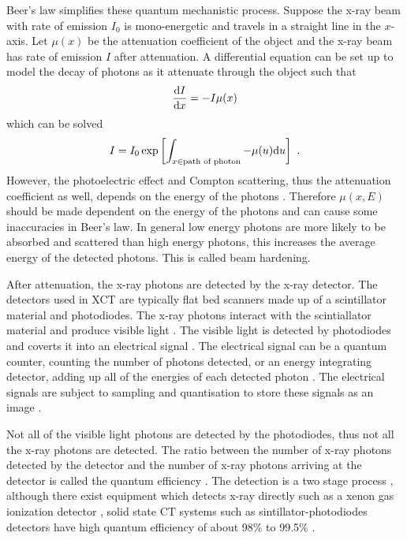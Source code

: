 Beer's law simplifies these quantum mechanistic process. Suppose the x-ray beam with rate of emission $I_0$ is mono-energetic and travels in a straight line in the $x$-axis. Let $\mu(x)$ be the attenuation coefficient of the object and the x-ray beam has rate of emission $I$ after attenuation. A differential equation can be set up to model the decay of photons as it attenuate through the object such that
\begin{equation}
\dfrac{\mathrm{d} I}{\mathrm{d} x} = -I\mu(x)
\end{equation}
which can be solved
\begin{equation}
I = I_0\exp\left[\int_{x \in \text{path of photon}}-\mu(u)\mathrm{d} u\right] \ .
\label{eq:beerLaw}
\end{equation}
However, the photoelectric effect and Compton scattering, thus the attenuation coefficient as well, depends on the energy of the photons \citep{elbakri2002statistical}. Therefore $\mu(x,E)$ should be made dependent on the energy of the photons \citep{cantatore2011introduction} and can cause some inaccuracies in Beer's law. In general low energy photons are more likely to be absorbed and scattered than high energy photons, this increases the average energy of the detected photons. This is called beam hardening.

After attenuation, the x-ray photons are detected by the x-ray detector. The detectors used in XCT are typically flat bed scanners made up of a scintillator material \citep{curran1953luminescence, greskovich1997ceramic} and photodiodes. The x-ray photons interact with the scintiallator material and produce visible light \citep{rossner1993conversion}. The visible light is detected by photodiodes and coverts it into an electrical signal \citep{michael2001x}. The electrical signal can be a quantum counter, counting the number of photons detected, or an energy integrating detector, adding up all of the energies of each detected photon \citep{whiting2006properties, kruth2011computed}. The electrical signals are subject to sampling and quantisation to store these signals as an image \citep{cierniak2011x}.

Not all of the visible light photons are detected by the photodiodes, thus not all the x-ray photons are detected. The ratio between the number of x-ray photons detected by the detector and the number of x-ray photons arriving at the detector is called the quantum efficiency \citep{cierniak2011x}. The detection is a two stage process \citep{cierniak2011x}, although there exist equipment which detects x-ray directly such as a xenon gas ionization detector \citep{fuchs2000direct}, solid state CT systems such as sintillator-photodiodes detectors have high quantum efficiency of about 98\% to 99.5\% \citep{hsieh2000investigation}.

